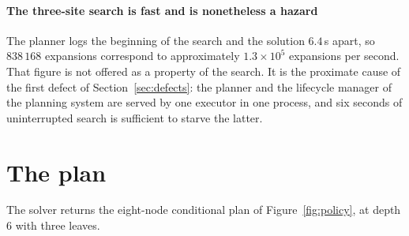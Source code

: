 \documentclass[11pt,a4paper]{article}
\theoremstyle{definition}
\begin{document}
\paragraph{The three-site search is fast and is nonetheless a hazard} The
planner logs the beginning of the search and the solution $6.4$\,s apart, so
$838\,168$ expansions correspond to approximately $1.3 \times 10^{5}$
expansions per second. That figure is not offered as a property of the search.
It is the proximate cause of the first defect of Section~\ref{sec:defects}: the
planner and the lifecycle manager of the planning system are served by one
executor in one process, and six seconds of uninterrupted search is sufficient
to starve the latter.

\section{The plan}
\label{sec:policy}

The solver returns the eight-node conditional plan of
Figure~\ref{fig:policy}, at depth $6$ with three leaves.
\end{document}
